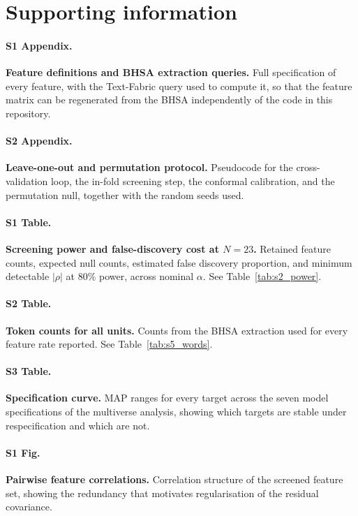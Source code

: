 \documentclass[10pt,letterpaper]{article}
\begin{document}
\section*{Supporting information}

\paragraph*{S1 Appendix.}
\label{S1_Appendix}
\textbf{Feature definitions and BHSA extraction queries.}
Full specification of every feature, with the Text-Fabric query used to
compute it, so that the feature matrix can be regenerated from the BHSA
independently of the code in this repository.

\paragraph*{S2 Appendix.}
\label{S2_Appendix}
\textbf{Leave-one-out and permutation protocol.}
Pseudocode for the cross-validation loop, the in-fold screening step, the
conformal calibration, and the permutation null, together with the random
seeds used.

\paragraph*{S1 Table.}
\label{S1_Table}
\textbf{Screening power and false-discovery cost at $N = 23$.}
Retained feature counts, expected null counts, estimated false discovery
proportion, and minimum detectable $|\rho|$ at 80\% power, across nominal
$\alpha$.  See Table~\ref{tab:s2_power}.

\paragraph*{S2 Table.}
\label{S2_Table}
\textbf{Token counts for all units.}
Counts from the BHSA extraction used for every feature rate reported.
See Table~\ref{tab:s5_words}.

\paragraph*{S3 Table.}
\label{S3_Table}
\textbf{Specification curve.}
MAP ranges for every target across the seven model specifications of the
multiverse analysis, showing which targets are stable under respecification
and which are not.

\paragraph*{S1 Fig.}
\label{S1_Fig}
\textbf{Pairwise feature correlations.}
Correlation structure of the screened feature set, showing the redundancy
that motivates regularisation of the residual covariance.
\end{document}
